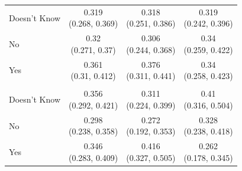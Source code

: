 \begin{tabular}[t]{lccc}
\addlinespace[0.3em]
\hline
\multicolumn{4}{l}{\textbf{Ink}}\\
\hline
\hspace{1em}Doesn't Know & \makecell[c]{0.319\\(0.268, 0.369)} & \makecell[c]{0.318\\(0.251, 0.386)} & \makecell[c]{0.319\\(0.242, 0.396)}\\
\hspace{1em}No & \makecell[c]{0.32\\(0.271, 0.37)} & \makecell[c]{0.306\\(0.244, 0.368)} & \makecell[c]{0.34\\(0.259, 0.422)}\\
\hspace{1em}Yes & \makecell[c]{0.361\\(0.31, 0.412)} & \makecell[c]{0.376\\(0.311, 0.441)} & \makecell[c]{0.34\\(0.258, 0.423)}\\
\addlinespace[0.3em]
\hline
\multicolumn{4}{l}{\textbf{Control}}\\
\hline
\hspace{1em}Doesn't Know & \makecell[c]{0.356\\(0.292, 0.421)} & \makecell[c]{0.311\\(0.224, 0.399)} & \makecell[c]{0.41\\(0.316, 0.504)}\\
\hspace{1em}No & \makecell[c]{0.298\\(0.238, 0.358)} & \makecell[c]{0.272\\(0.192, 0.353)} & \makecell[c]{0.328\\(0.238, 0.418)}\\
\hspace{1em}Yes & \makecell[c]{0.346\\(0.283, 0.409)} & \makecell[c]{0.416\\(0.327, 0.505)} & \makecell[c]{0.262\\(0.178, 0.345)}\\
\bottomrule
\end{tabular}

